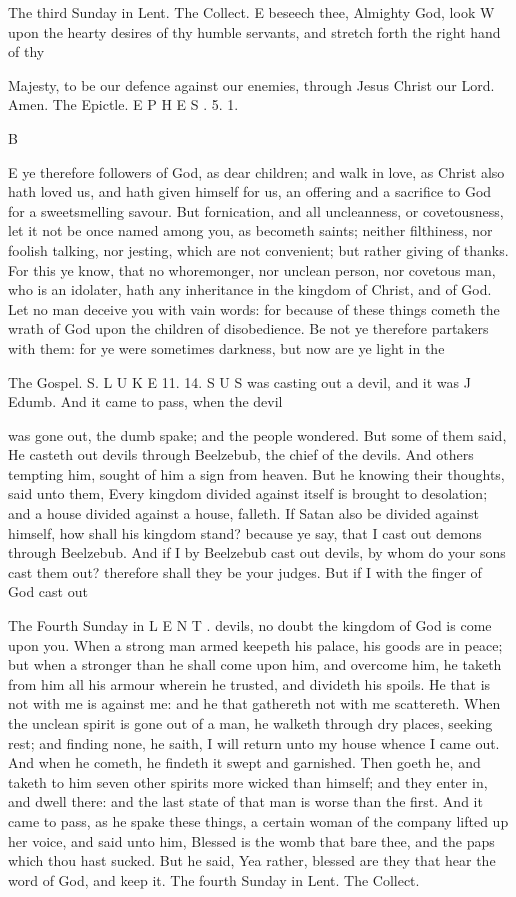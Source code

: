 The third Sunday in Lent. The Collect. E beseech thee, Almighty God, look W upon the hearty desires of thy humble servants, and stretch forth the right hand of thy

Majesty, to be our defence against our enemies, through Jesus Christ our Lord. Amen. The Epictle. E P H E S . 5. 1.

B

E ye therefore followers of God, as dear children; and walk in love, as Christ also hath loved us, and hath given himself for us, an offering and a sacrifice to God for a sweetsmelling savour. But fornication, and all uncleanness, or covetousness, let it not be once named among you, as becometh saints; neither filthiness, nor foolish talking, nor jesting, which are not convenient; but rather giving of thanks. For this ye know, that no whoremonger, nor unclean person, nor covetous man, who is an idolater, hath any inheritance in the kingdom of Christ, and of God. Let no man deceive you with vain words: for because of these things cometh the wrath of God upon the children of disobedience. Be not ye therefore partakers with them: for ye were sometimes darkness, but now are ye light in the

The Gospel. S. L U K E 11. 14. S U S was casting out a devil, and it was J Edumb. And it came to pass, when the devil

was gone out, the dumb spake; and the people wondered. But some of them said, He casteth out devils through Beelzebub, the chief of the devils. And others tempting him, sought of him a sign from heaven. But he knowing their thoughts, said unto them, Every kingdom divided against itself is brought to desolation; and a house divided against a house, falleth. If Satan also be divided against himself, how shall his kingdom stand? because ye say, that I cast out demons through Beelzebub. And if I by Beelzebub cast out devils, by whom do your sons cast them out? therefore shall they be your judges. But if I with the finger of God cast out

The Fourth Sunday in L E N T . devils, no doubt the kingdom of God is come upon you. When a strong man armed keepeth his palace, his goods are in peace; but when a stronger than he shall come upon him, and overcome him, he taketh from him all his armour wherein he trusted, and divideth his spoils. He that is not with me is against me: and he that gathereth not with me scattereth. When the unclean spirit is gone out of a man, he walketh through dry places, seeking rest; and finding none, he saith, I will return unto my house whence I came out. And when he cometh, he findeth it swept and garnished. Then goeth he, and taketh to him seven other spirits more wicked than himself; and they enter in, and dwell there: and the last state of that man is worse than the first. And it came to pass, as he spake these things, a certain woman of the company lifted up her voice, and said unto him, Blessed is the womb that bare thee, and the paps which thou hast sucked. But he said, Yea rather, blessed are they that hear the word of God, and keep it. The fourth Sunday in Lent. The Collect.

